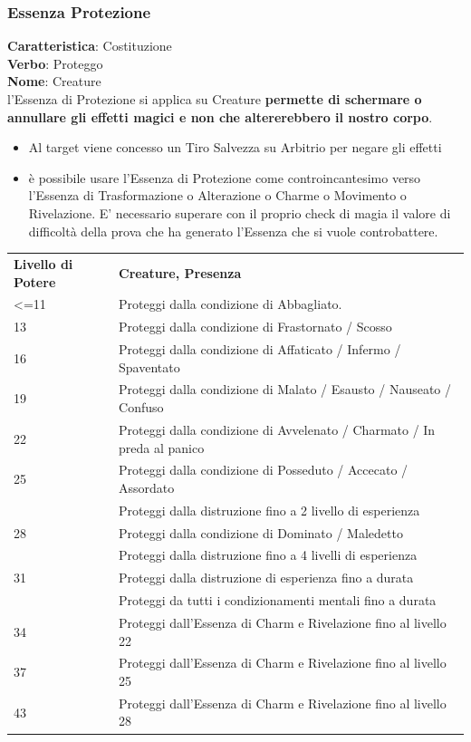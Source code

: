 \documentclass[a4paper,10 pt,twoside,openany]{book}
\begin{document}
\pagebreak

\subsubsection{Essenza Protezione}

\label{essenza-protezione---potenza}

\textbf{Caratteristica}: Costituzione\\
\textbf{Verbo}: Proteggo\\
\textbf{Nome}: Creature\\

l'Essenza di Protezione si applica su Creature \textbf{permette di schermare o annullare gli effetti magici e non che altererebbero il nostro corpo}.

\begin{itemize}
	\item
	Al target viene concesso un Tiro Salvezza su Arbitrio per negare gli effetti
	\item
	è possibile usare l'Essenza di Protezione come controincantesimo verso l'Essenza di Trasformazione o Alterazione o Charme o Movimento o Rivelazione. E' necessario superare con il proprio check di magia il valore di difficoltà della prova che ha generato l'Essenza che si vuole controbattere.
\end{itemize}

\bigskip

\begin{tabularx}{0.95\textwidth}{lX}
	\toprule
	\textbf{Livello di Potere} & \textbf{Creature, Presenza}\\
	\textless=11& Proteggi dalla condizione di Abbagliato.\\
	13& Proteggi dalla condizione di Frastornato / Scosso\\
	16& Proteggi dalla condizione di Affaticato / Infermo / Spaventato\\
	19& Proteggi dalla condizione di Malato / Esausto / Nauseato / Confuso\\
	22& Proteggi dalla condizione di Avvelenato / Charmato / In preda al panico\\
	25& Proteggi dalla condizione di Posseduto / Accecato / Assordato \\
	& Proteggi dalla distruzione fino a 2 livello di esperienza   \\
	28& Proteggi dalla condizione di Dominato / Maledetto   \\
	& Proteggi dalla distruzione fino a 4 livelli di esperienza   \\
	31& Proteggi dalla distruzione di esperienza fino a durata   \\
	& Proteggi da tutti i condizionamenti mentali fino a durata\\
	34& Proteggi dall'Essenza di Charm e Rivelazione fino al livello 22\\
	37& Proteggi dall'Essenza di Charm e Rivelazione fino al livello 25\\
	43& Proteggi dall'Essenza di Charm e Rivelazione fino al livello 28\\
\end{tabularx}
\end{document}
